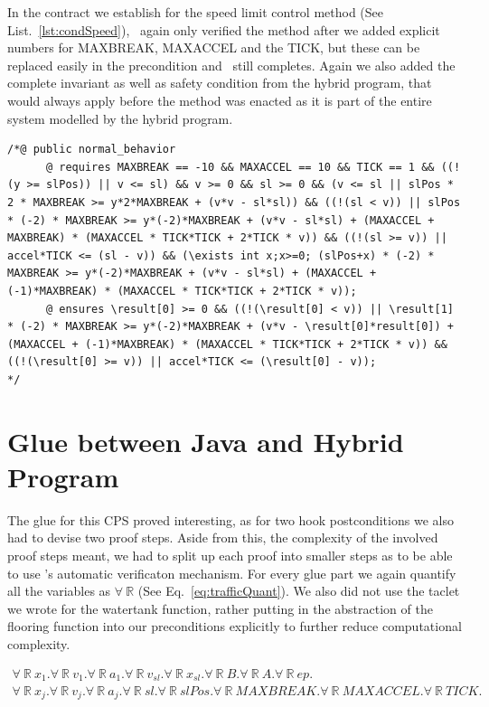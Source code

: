 In the contract we establish for the speed limit control method (See List.~\ref{lst:condSpeed}), \key~again only verified the method after we added explicit numbers for MAXBREAK, MAXACCEL and the TICK, but these can be replaced easily in the precondition and \key~still completes. Again we also added the complete invariant as well as safety condition from the hybrid program, that would always apply before the method was enacted as it is part of the entire system modelled by the hybrid program.

\begin{lstlisting}[label=lst:condSpeed]
/*@ public normal_behavior
	  @ requires MAXBREAK == -10 && MAXACCEL == 10 && TICK == 1 && ((!(y >= slPos)) || v <= sl) && v >= 0 && sl >= 0 && (v <= sl || slPos * 2 * MAXBREAK >= y*2*MAXBREAK + (v*v - sl*sl)) && ((!(sl < v)) || slPos * (-2) * MAXBREAK >= y*(-2)*MAXBREAK + (v*v - sl*sl) + (MAXACCEL + MAXBREAK) * (MAXACCEL * TICK*TICK + 2*TICK * v)) && ((!(sl >= v)) || accel*TICK <= (sl - v)) && (\exists int x;x>=0; (slPos+x) * (-2) * MAXBREAK >= y*(-2)*MAXBREAK + (v*v - sl*sl) + (MAXACCEL + (-1)*MAXBREAK) * (MAXACCEL * TICK*TICK + 2*TICK * v));
	  @ ensures \result[0] >= 0 && ((!(\result[0] < v)) || \result[1] * (-2) * MAXBREAK >= y*(-2)*MAXBREAK + (v*v - \result[0]*result[0]) + (MAXACCEL + (-1)*MAXBREAK) * (MAXACCEL * TICK*TICK + 2*TICK * v)) && ((!(\result[0] >= v)) || accel*TICK <= (\result[0] - v));
*/
\end{lstlisting}

\section{Glue between Java and Hybrid Program}
\label{sec:traffic:glue}

The glue for this CPS proved interesting, as for two hook postconditions we also had to devise two proof steps. Aside from this, the complexity of the involved proof steps meant, we had to split up each proof into smaller steps as to be able to use \keym's automatic verificaton mechanism. For every glue part we again quantify all the variables as \(\forall~\mathbb{R}\) (See Eq.~\ref{eq:trafficQuant}). We also did not use the taclet we wrote for the watertank function, rather putting in the abstraction of the flooring function into our preconditions explicitly to further reduce computational complexity.

\begin{equation}
	\begin{split}
	\forall~\mathbb{R}~x_1 .\forall~\mathbb{R}~v_1 .\forall~\mathbb{R}~a_1 .\forall~\mathbb{R}~v_{sl} .\forall~\mathbb{R}~x_{sl} .\forall~\mathbb{R}~B .\forall~\mathbb{R}~A . \forall~\mathbb{R}~ep . \\ \forall~\mathbb{R}~x_j .\forall~\mathbb{R}~v_j .\forall~\mathbb{R}~a_j .\forall~\mathbb{R}~sl .\forall~\mathbb{R}~slPos .\forall~\mathbb{R}~MAXBREAK .\forall~\mathbb{R}~MAXACCEL .\forall~\mathbb{R}~TICK .
	\end{split}
	\label{eq:trafficQuant}
\end{equation}

